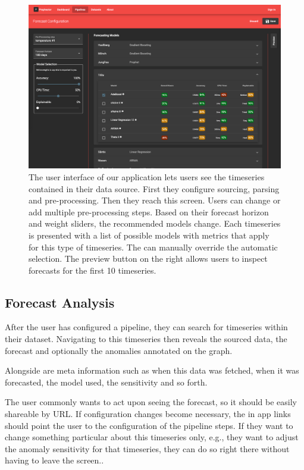 \begin{figure}
\centerline{\includegraphics[scale=.3]{Figures/pipeline-config-screenshot.png}}
\caption{The user interface of our application lets users see the timeseries contained in their data source. First they configure sourcing, parsing and pre-processing. Then they reach this screen. Users can change or add multiple pre-processing steps. Based on their forecast horizon and weight sliders, the recommended models change. Each timeseries is presented with a list of possible models with metrics that apply for this type of timeseries. The can manually override the automatic selection. The preview button on the right allows users to inspect forecasts for the first 10 timeseries.}
\label{fig:pipeline-config-screenshot}
\end{figure}

\subsection{Forecast Analysis}

After the user has configured a pipeline, they can search for timeseries within their dataset. Navigating to this timeseries then reveals the sourced data, the forecast and optionally the anomalies annotated on the graph.

Alongside are meta information such as when this data was fetched, when it was forecasted, the model used, the sensitivity and so forth.

The user commonly wants to act upon seeing the forecast, so it should be easily shareable by URL. If configuration changes become necessary, the in app links should point the user to the configuration of the pipeline steps. If they want to change something particular about this timeseries only, e.g., they want to adjust the anomaly sensitivity for that timeseries, they can do so right there without having to leave the screen..

